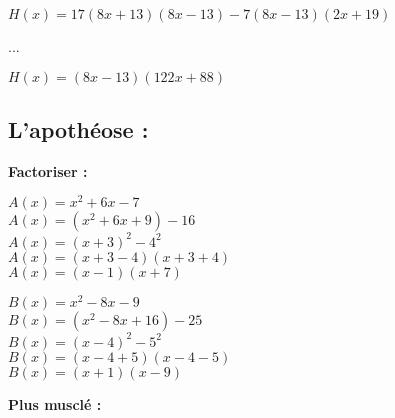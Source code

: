 $ H(x) = 17\left(8x+13\right)\left(8x-13\right) - 7\left(8x-13\right)\left(2x+19\right) $

...

$ H(x) = \left(8x-13\right)\left(122x + 88\right) $ \\

\newpage 
\subsection{L'apothéose :}

\textbf{Factoriser :}

\vspace{1cm}

\begin{minipage}{.5 \textwidth}
$ A(x) = x^2 + 6x - 7 $\\

$ A(x) = \left(x^2 + 6x + 9\right) - 16 $\\

$ A(x) = \left(x + 3 \right)^2 - 4^2 $\\

$ A(x) = \left(x+3-4\right)\left(x+3+4\right) $\\

$ A(x) = \left(x-1\right)\left(x+7\right) $
\end{minipage}
\begin{minipage}{.5 \textwidth}
$ B(x) = x^2 - 8x - 9 $\\

$ B(x) = \left(x^2-8x+16\right) - 25 $\\

$ B(x) = \left(x-4\right)^2 - 5^2 $\\

$ B(x) = \left(x-4+5\right)\left(x-4-5\right) $\\

$ B(x) = \left(x+1\right)\left(x-9\right) $
\end{minipage}


\vspace{1cm}


\textbf{Plus musclé :}

\vspace{1cm}


